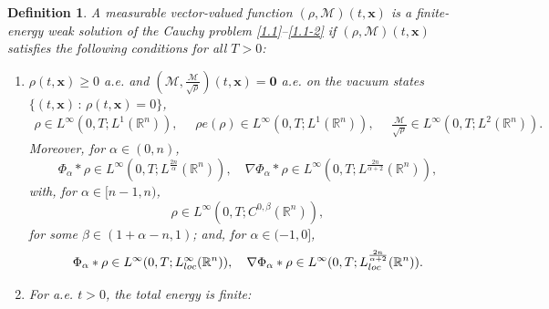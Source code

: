 \documentclass[10pt,a4paper]{amsart}
\newtheorem{definition}{Definition}
\def\M{{\mathcal{M}}}
\begin{document}
\begin{definition}\label{definition}
A measurable vector-valued function $(\rho,\M)(t, \boldsymbol{x})$ is a finite-energy weak solution 
of the Cauchy problem \eqref{1.1}--\eqref{1.1-2} if
$(\rho,\M)(t, \boldsymbol{x})$ satisfies the following conditions for all $T>0${\rm :}
\begin{enumerate}
\item[(a)] $\rho(t,\boldsymbol{x}) \geq 0$ {\it a.e.} and $(\M, \frac{\M}{\sqrt{\rho}})(t,\boldsymbol{x}) = \boldsymbol{0}$ {\it a.e.} on the vacuum states $\{ (t,\boldsymbol{x}) \, : \, \rho(t,\boldsymbol{x}) = 0 \}$,
\begin{align*}
\rho\in L^{\infty}(0,T; L^1(\mathbb{R}^n)), \quad \,\, 
\rho e(\rho)\in L^{\infty}(0,T; L^1(\mathbb{R}^n)), \quad\,\,
 \frac{\M}{\sqrt{\rho}}\in L^{\infty}(0,T; L^2(\mathbb{R}^n)).
    \end{align*}
 Moreover, for $\alpha \in (0,n)$,
    \[
\Phi_\alpha * \rho\in L^\infty(0,T;L^{\frac{2n}{\alpha}}(\mathbb{R}^n) ),\quad
\nabla\Phi_\alpha * \rho\in L^\infty(0,T;L^{\frac{2n}{\alpha + 2}}(\mathbb{R}^n)),
  \]
 with, for $\alpha \in [n-1,n)$,
 \[
 \rho \in L^\infty(0,T;C^{0,\beta}(\mathbb{R}^n)),
  \]
    for some $\beta \in (1 + \alpha - n,1)$; and, for $\alpha \in (-1,0]$,
    \[
 \Phi_\alpha * \rho\in L^\infty(0,T;L^\infty_{\rm loc}(\mathbb{R}^n) ),\quad
\nabla\Phi_\alpha * \rho\in L^\infty(0,T;L_{\rm loc}^{\frac{2n}{\alpha + 2}}(\mathbb{R}^n)).
 \]
\item[(b)] For {\it a.e.} $t>0$, the total energy is finite{\rm :}


\end{enumerate}
\end{definition}
\end{document}

